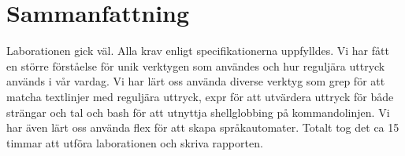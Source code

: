 \section{Sammanfattning}
Laborationen gick väl. Alla krav enligt specifikationerna uppfylldes. Vi har fått en större förståelse för unik verktygen som användes och hur reguljära uttryck används i vår vardag. Vi har lärt oss använda diverse verktyg som grep för att matcha textlinjer med reguljära uttryck, expr för att utvärdera uttryck för både strängar och tal och bash för att utnyttja shellglobbing på kommandolinjen. Vi har även lärt oss använda flex för att skapa språkautomater. Totalt tog det ca 15 timmar att utföra laborationen och skriva rapporten. 
